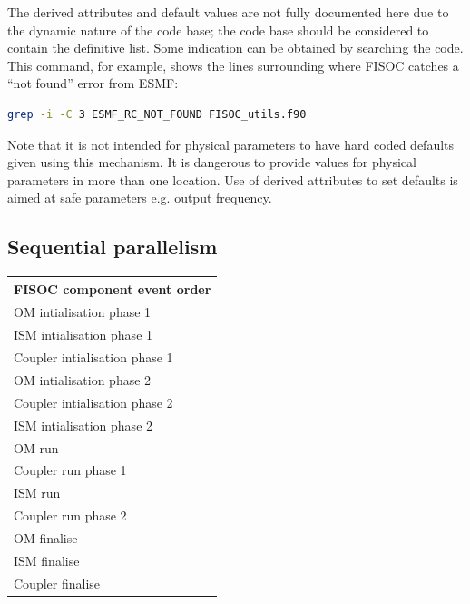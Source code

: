 \documentclass[11pt]{article}
\begin{document}
The derived attributes and default values are not fully documented here due to the
dynamic nature of the code base; the code base should be considered to contain the definitive
list.
Some indication can be obtained by searching the code.
This command, for example, shows the lines surrounding where FISOC catches a ``not found''
error from ESMF: 
\begin{lstlisting}[language=bash]
 grep -i -C 3 ESMF_RC_NOT_FOUND FISOC_utils.f90
\end{lstlisting}
Note that it is not intended for physical parameters to have hard coded defaults given
using this mechanism.
It is dangerous to provide values for physical parameters in more than one location.
Use of derived attributes to set defaults is aimed at safe parameters e.g. output frequency.






\subsection{Sequential parallelism}

\begin{table}
  \begin{tabular}{|l}
    \textbf{FISOC component event order}  \\
    \hline
    OM intialisation phase 1 \\
    ISM intialisation phase 1 \\
    Coupler intialisation phase 1 \\
    OM intialisation phase 2 \\
    Coupler intialisation phase 2 \\
    ISM intialisation phase 2 \\
    OM run \\
    Coupler run phase 1 \\
    ISM run \\
    Coupler run phase 2 \\
    OM finalise \\
    ISM finalise \\
    Coupler finalise \\
  \end{tabular}
  \label{tab:order}
\end{table}
\end{document}
